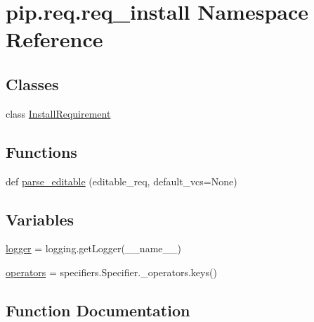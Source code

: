 \hypertarget{namespacepip_1_1req_1_1req__install}{}\section{pip.\+req.\+req\+\_\+install Namespace Reference}
\label{namespacepip_1_1req_1_1req__install}
\subsection*{Classes}
\begin{DoxyCompactItemize}
\item 
class \hyperlink{classpip_1_1req_1_1req__install_1_1_install_requirement}{Install\+Requirement}
\end{DoxyCompactItemize}
\subsection*{Functions}
\begin{DoxyCompactItemize}
\item 
def \hyperlink{namespacepip_1_1req_1_1req__install_a1853f0cef92560a732bfd2e123a4648b}{parse\+\_\+editable} (editable\+\_\+req, default\+\_\+vcs=None)
\end{DoxyCompactItemize}
\subsection*{Variables}
\begin{DoxyCompactItemize}
\item 
\hyperlink{namespacepip_1_1req_1_1req__install_ae15c5cd2c51e341940f01673747a8478}{logger} = logging.\+get\+Logger(\+\_\+\+\_\+name\+\_\+\+\_\+)
\item 
\hyperlink{namespacepip_1_1req_1_1req__install_a470d6a51215a2733e49c12bd7a5e1c72}{operators} = specifiers.\+Specifier.\+\_\+operators.\+keys()
\end{DoxyCompactItemize}


\subsection{Function Documentation}
\mbox{\label{namespacepip_1_1req_1_1req__install_a1853f0cef92560a732bfd2e123a4648b}} 
